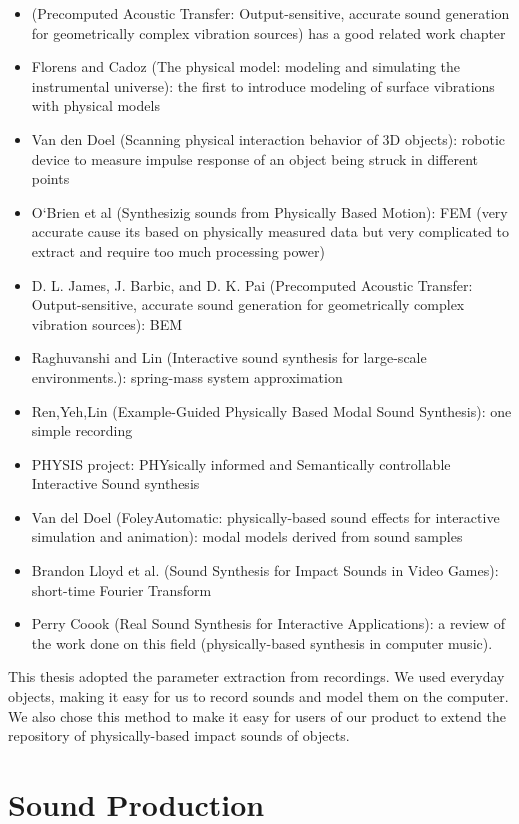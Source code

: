 \begin{itemize}
\item (Precomputed Acoustic Transfer: Output-sensitive, accurate sound generation for geometrically complex vibration sources) has a good related work chapter
\item  Florens and Cadoz (The physical model: modeling and simulating the instrumental universe): the first to introduce modeling of surface vibrations with physical models
\item Van den Doel (Scanning physical interaction behavior of 3D objects): robotic device to measure impulse response of an object being struck in different points
\item  O`Brien et al (Synthesizig sounds from Physically Based Motion): FEM (very accurate cause its based on physically measured data but very complicated to extract and require too much processing power)
\item D. L. James, J. Barbic, and D. K. Pai (Precomputed Acoustic Transfer: Output-sensitive, accurate sound generation for geometrically complex vibration sources): BEM
\item Raghuvanshi and Lin (Interactive sound synthesis for large-scale environments.): spring-mass system approximation
\item Ren,Yeh,Lin (Example-Guided Physically Based Modal Sound Synthesis): one simple recording
\item PHYSIS project: PHYsically informed and Semantically controllable
Interactive Sound synthesis
\item Van del Doel (FoleyAutomatic: physically-based sound effects for interactive simulation and animation): modal models derived from sound samples
\item Brandon Lloyd et al. (Sound Synthesis for Impact Sounds in Video Games): short-time Fourier Transform
\item Perry Coook (Real Sound Synthesis for Interactive Applications): a review of the work done on this field (physically-based synthesis in computer music).
\end{itemize}


This thesis adopted the parameter extraction from recordings. We used everyday objects, making it easy for us to record sounds and model them on the computer. We also chose this method to make it easy for users of our product to extend the repository of physically-based impact sounds of objects.

\section{Sound Production}

